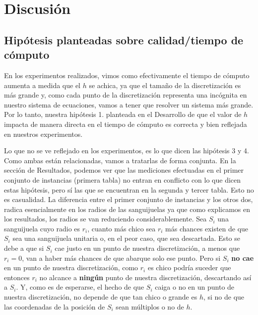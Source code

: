 \section{Discusión}
\subsection{Hipótesis planteadas sobre calidad/tiempo de cómputo}
\par En los experimentos realizados, vimos como efectivamente el tiempo de cómputo aumenta a medida que el $h$ se achica, ya que el tamaño de la discretización es más grande y, como cada punto de la discretización representa una incógnita en nuestro sistema de ecuaciones, vamos a tener que resolver un sistema más grande. Por lo tanto, nuestra hipótesis 1. planteada en el Desarrollo de que el valor de $h$ impacta de manera directa en el tiempo de cómputo es correcta y bien reflejada en nuestros experimentos.
\par Lo que no se ve reflejado en los experimentos, es lo que dicen las hipótesis 3 y 4. Como ambas están relacionadas, vamos a tratarlas de forma conjunta. En la sección de Resultados, podemos ver que las mediciones efectuadas en el primer conjunto de instancias (primera tabla) no entran en conflicto con lo que dicen estas hipótesis, pero sí las que se encuentran en la segunda y tercer tabla. Esto no es casualidad. La diferencia entre el primer conjunto de instancias y los otros dos, radica esencialmente en los radios de las sanguijuelas ya que como explicamos en los resultados, los radios se van reduciendo considerablemente. Sea  $S_i$ una sanguijuela cuyo radio es $r_i$, cuanto más chico sea $r_i$ más chances existen de que $S_i$ sea una sanguijuela unitaria o, en el peor caso, que sea descartada. Esto se debe a que si $S_i$ cae justo en un punto de nuestra discretización, a menos que $r_i = 0$, van a haber más chances de que abarque solo ese punto. Pero si $S_i$ \textbf{no cae} en un punto de nuestra discretización, como $r_i$ es chico podría suceder que entonces $r_i$ no alcance a \textbf{ningún} punto de nuestra discretización, descartando así a $S_i$. Y, como es de esperarse, el hecho de que $S_i$ caiga o no en un punto de nuestra discretización, no depende de que tan chico o grande es $h$, si no de que las coordenadas de la posición de $S_i$ sean múltiplos o no de $h$.
